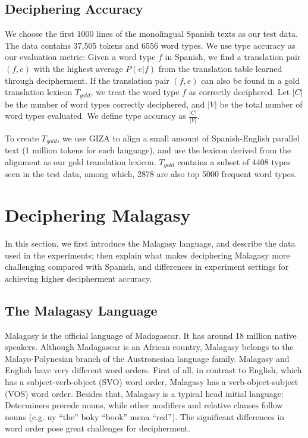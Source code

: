 \subsection{Deciphering Accuracy}
We choose the first 1000 lines of the monolingual Spanish texts as our test data. The data contains 37,505 tokens and 6556 word types. We use type accuracy as our evaluation metric: Given a word type $f$ in Spanish, we find a translation pair $(f,e)$ with the highest average $P(e|f)$ from the translation table learned through decipherment. If the translation pair $(f,e)$ can also be found in a gold translation lexicon $T_{gold}$, we treat the word type $f$ as correctly deciphered. Let $|C|$ be the number of word types correctly deciphered, and $|V|$ be the total number of word types evaluated. We define type accuracy as $\frac{|C|}{|V|}$.

To create $T_{gold}$, we use GIZA \cite{Och:2003:SCV:778822.778824} to align a small amount of Spanish-English parallel text (1 million tokens for each language), and use the lexicon derived from the alignment as our gold translation lexicon. $T_{gold}$ contains a subset of 4408 types seen in the test data, among which, 2878 are also top 5000 frequent word types.

\section{Deciphering Malagasy}
\label{decipher_gigaword}
In this section, we first introduce the Malagasy language, and describe the data used in the experiments; then explain what makes deciphering Malagasy more challenging compared with Spanish, and differences in experiment settings for achieving higher decipherment accuracy.

\subsection{The Malagasy Language}
Malagasy is the official language of Madagascar. It has around 18 million native speakers. Although Madagascar is an African country, Malagasy belongs to the Malayo-Polynesian branch of the Austronesian language family. Malagasy and English have very different word orders. First of all, in contrast to English, which has a subject-verb-object (SVO) word order, Malagasy has a verb-object-subject (VOS) word order. Besides that, Malagasy is a typical head initial language: Determiners precede nouns, while other modifiers and relative clauses follow nouns (e.g. ny ``the'' boky ``book'' mena ``red''). The significant differences in word order pose great challenges for decipherment.


